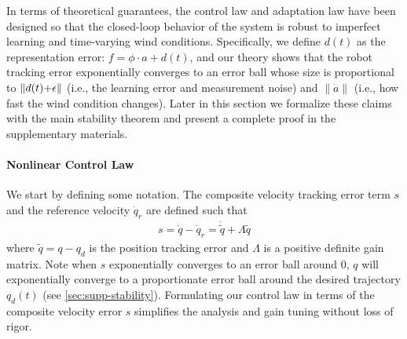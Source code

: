 In terms of theoretical guarantees, the control law and adaptation law have been designed so that the closed-loop behavior of the system is robust to imperfect learning and time-varying wind conditions. Specifically, we define $d(t)$ as the representation error: $f = \phi \cdot a + d(t)$, and our theory shows that the robot tracking error exponentially converges to an error ball whose size is proportional to $\|d(t){+\epsilon}\|$ (i.e., the learning error and measurement noise) and $\|\dot{a}\|$ (i.e., how fast the wind condition changes). Later in this section we formalize these claims with the main stability theorem and present a complete proof in the supplementary materials.  

\paragraph{Nonlinear Control Law}
We start by defining some notation. The composite velocity tracking error term $s$ and the reference velocity $\dot q_r$ are defined such that 
\begin{align}
    \label{eq:s-dynamics}
    s = \dot q - \dot q_r = \dot{\tilde{q}} + \Lambda \tilde{q}
\end{align}
where $\tilde{q} = q - q_d$ is the position tracking error and $\Lambda$ is a positive definite gain matrix. Note when $s$ exponentially converges to an error ball around $0$, $q$ will exponentially converge to a proportionate error ball around the desired trajectory $q_d(t)$ (see \ref{sec:supp-stability}). Formulating our control law in terms of the composite velocity error $s$ simplifies the analysis and gain tuning without loss of rigor. 

